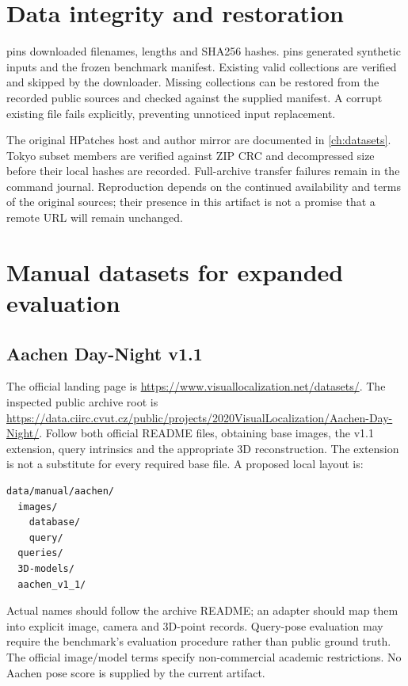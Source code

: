 \section{Data integrity and restoration}
 pins downloaded filenames, lengths and SHA256 hashes.  pins generated synthetic inputs and the frozen benchmark manifest. Existing valid collections are verified and skipped by the downloader. Missing collections can be restored from the recorded public sources and checked against the supplied manifest. A corrupt existing file fails explicitly, preventing unnoticed input replacement.

The original HPatches host and author mirror are documented in \cref{ch:datasets}. Tokyo subset members are verified against ZIP CRC and decompressed size before their local hashes are recorded. Full-archive transfer failures remain in the command journal. Reproduction depends on the continued availability and terms of the original sources; their presence in this artifact is not a promise that a remote URL will remain unchanged.

\ifFullReport
\section{Manual datasets for expanded evaluation}
\subsection{Aachen Day-Night v1.1}
The official landing page is \url{https://www.visuallocalization.net/datasets/}. The inspected public archive root is \url{https://data.ciirc.cvut.cz/public/projects/2020VisualLocalization/Aachen-Day-Night/}. Follow both official README files, obtaining base images, the v1.1 extension, query intrinsics and the appropriate 3D reconstruction. The extension is not a substitute for every required base file. A proposed local layout is:
\begin{lstlisting}[numbers=none]
data/manual/aachen/
  images/
    database/
    query/
  queries/
  3D-models/
  aachen_v1_1/
\end{lstlisting}
Actual names should follow the archive README; an adapter should map them into explicit image, camera and 3D-point records. Query-pose evaluation may require the benchmark's evaluation procedure rather than public ground truth. The official image/model terms specify non-commercial academic restrictions. No Aachen pose score is supplied by the current artifact.

